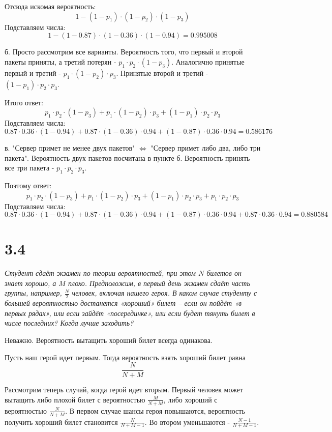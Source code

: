 \documentclass[a4paper,12pt]{article}
\begin{document}
Отсюда искомая вероятность:
\[1 - (1 - p_1) \cdot (1 - p_2) \cdot (1 - p_3)\]
Подставляем числа:
\[1 - (1 - 0.87) \cdot (1 - 0.36) \cdot (1 - 0.94) = 0.995008\]

б. Просто рассмотрим все варианты.
Вероятность того, что первый и второй пакеты приняты, а третий потерян - $p_1 \cdot p_2 \cdot (1 - p_3)$.
Аналогично принятые первый и третий - $p_1 \cdot (1 - p_2) \cdot p_3$.
Принятые второй и третий - $(1 - p_1) \cdot p_2 \cdot p_3$.

Итого ответ:
\[p_1 \cdot p_2 \cdot (1 - p_3) + p_1 \cdot (1 - p_2) \cdot p_3 + (1 - p_1) \cdot p_2 \cdot p_3\]
Подставляем числа:
\[0.87 \cdot 0.36 \cdot (1 - 0.94) + 0.87 \cdot (1 - 0.36) \cdot 0.94 + (1 - 0.87) \cdot 0.36 \cdot 0.94 = 0.586176\]

в. "Сервер примет не менее двух пакетов" $\Leftrightarrow$ "Сервер примет либо два, либо три пакета".
Вероятность двух пакетов посчитана в пункте б.
Вероятность принять все три пакета - $p_1 \cdot p_2 \cdot p_3$.

Поэтому ответ:
\[p_1 \cdot p_2 \cdot (1 - p_3) + p_1 \cdot (1 - p_2) \cdot p_3 + (1 - p_1) \cdot p_2 \cdot p_3 + p_1 \cdot p_2 \cdot p_3\]
Подставляем числа:
\[0.87 \cdot 0.36 \cdot (1 - 0.94) + 0.87 \cdot (1 - 0.36) \cdot 0.94 + (1 - 0.87) \cdot 0.36 \cdot 0.94 + 0.87 \cdot 0.36 \cdot 0.94 = 0.880584\]




\section*{3.4}

\textit{Студент сдаёт экзамен по теории вероятностей, при этом $N$ билетов он знает хорошо, а $M$ плохо.
Предположим, в первый день экзамен сдаёт часть группы, например, $\frac{N}{2}$ человек, включая нашего героя.
В каком случае студенту с большей вероятностью достанется «хороший» билет – если он пойдёт «в первых рядах», или если зайдёт «посерединке», или если будет тянуть билет в числе последних?
Когда лучше заходить?}

Неважно.
Вероятность вытащить хороший билет всегда одинакова.

Пусть наш герой идет первым.
Тогда вероятность взять хороший билет равна
\[\frac{N}{N + M}\]

Рассмотрим теперь случай, когда герой идет вторым.
Первый человек может вытащить либо плохой билет с вероятностью $\frac{M}{N + M}$, либо хороший с вероятностью $\frac{N}{N + M}$.
В первом случае шансы героя повышаются, вероятность получить хороший билет становится $\frac{N}{N + M - 1}$.
Во втором уменьшаются - $\frac{N - 1}{N + M - 1}$.
\end{document}
